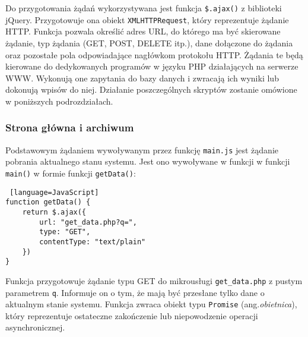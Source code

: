 \documentclass[a4paper,12pt,twoside]{article}
\begin{document}
Do przygotowania żądań wykorzystywana jest funkcja \texttt{\$.ajax()} z biblioteki jQuery. Przygotowuje ona obiekt \texttt{XMLHTTPRequest}, który reprezentuje żądanie HTTP. Funkcja pozwala określić adres URL, do którego ma być skierowane żądanie, typ żądania (GET, POST, DELETE itp.), dane dołączone do żądania oraz pozostałe pola odpowiadające nagłówkom protokołu HTTP. Żądania te będą kierowane do dedykowanych programów w języku PHP działających na serwerze WWW. Wykonują one zapytania do bazy danych i zwracają ich wyniki lub dokonują wpisów do niej. Działanie poszczególnych skryptów zostanie omówione w poniższych podrozdziałach.

\subsubsection{Strona główna i archiwum}
Podstawowym żądaniem wywoływanym przez funkcję \texttt{main.js} jest żądanie pobrania aktualnego stanu systemu. Jest ono wywoływane w funkcji w funkcji \texttt{main()} w formie funkcji \texttt{getData()}:
\begin{lstlisting} [language=JavaScript]
function getData() {
    return $.ajax({
        url: "get_data.php?q=",
        type: "GET",
        contentType: "text/plain"
    })
}
\end{lstlisting}
Funkcja przygotowuje żądanie typu GET do mikrousługi \texttt{get{\_}data.php} z pustym parametrem \texttt{q}. Informuje on o tym, że mają być przesłane tylko dane o aktualnym stanie systemu. Funkcja zwraca obiekt typu \texttt{Promise} (ang.\textit{obietnica}), który reprezentuje ostateczne zakończenie lub niepowodzenie operacji asynchronicznej.\cite{promise} 
\end{document}

